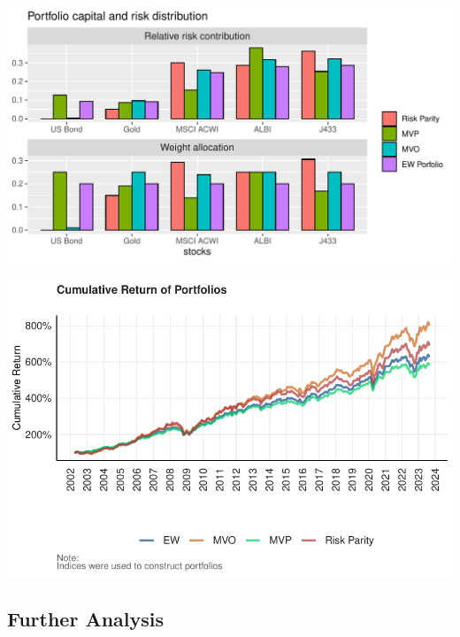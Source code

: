 \documentclass[12pt,preprint, authoryear]{elsarticle}
\let\origfigure\figure
\let\endorigfigure\endfigure
\renewenvironment{figure}[1][2] {
    \expandafter\origfigure\expandafter[H]
} {
    \endorigfigure
}
\numberwithin{equation}{section}
\numberwithin{figure}{section}
\numberwithin{table}{section}
\begin{document}
\begin{figure}[H]

{\centering \includegraphics{Finmetrics_Project_files/figure-latex/Figure1-1} 

}

\caption{Relative risk contribution and Weights allocation of different portfolios \label{Figure1}}\label{fig:Figure1}
\end{figure}

\begin{figure}[H]

{\centering \includegraphics{Finmetrics_Project_files/figure-latex/Figure2-1} 

}

\caption{Cumulative Returns \label{Figure2}}\label{fig:Figure2}
\end{figure}

\hypertarget{further-analysis}{%
\subsection{Further Analysis}\label{further-analysis}}
\end{document}

